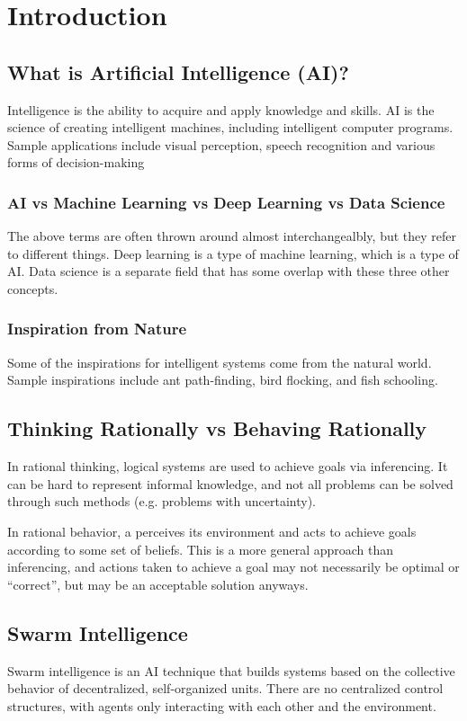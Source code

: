 \documentclass[12pt,titlepage]{article}
\begin{document}
  \section{Introduction}

    \subsection{What is Artificial Intelligence (AI)?}
      Intelligence is the ability to acquire and apply knowledge and skills. AI is the science of creating intelligent machines,
      including intelligent computer programs. Sample applications include visual perception, speech recognition and various
      forms of decision-making

      \subsubsection{AI vs Machine Learning vs Deep Learning vs Data Science}
        The above terms are often thrown around almost interchangealbly, but they refer to different things. Deep learning is
        a type of machine learning, which is a type of AI. Data science is a separate field that has some overlap with these
        three other concepts.

      \subsubsection{Inspiration from Nature}
        Some of the inspirations for intelligent systems come from the natural world. Sample inspirations include ant path-finding,
        bird flocking, and fish schooling.

    \subsection{Thinking Rationally vs Behaving Rationally}
      In rational thinking, logical systems are used to achieve goals via inferencing. It can be hard to represent informal knowledge,
      and not all problems can be solved through such methods (e.g. problems with uncertainty).

      In rational behavior, a perceives its environment and acts to achieve goals according to some set of beliefs. This is a more
      general approach than inferencing, and actions taken to achieve a goal may not necessarily be optimal or ``correct'', but
      may be an acceptable solution anyways.
      
    \subsection{Swarm Intelligence}
      Swarm intelligence is an AI technique that builds systems based on the collective behavior of decentralized, self-organized units.
      There are no centralized control structures, with agents only interacting with each other and the environment.
\end{document}
